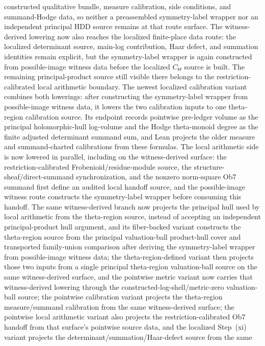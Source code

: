 \documentclass[11pt]{article}
\theoremstyle{plain}
\theoremstyle{definition}
\theoremstyle{remark}
\begin{document}
constructed qualitative bundle, measure calibration, side conditions, and
summand-Hodge data, so neither a preassembled symmetry-label wrapper nor an
independent principal HDD source remains at that route surface.  The
witness-derived lowering now also reaches the localized finite-place data
route: the localized determinant source, main-log contribution, Haar defect,
and summation identities remain explicit, but the symmetry-label wrapper is
again constructed from possible-image witness data before the localized
\(C_\Theta\) source is built.  The remaining principal-product source still
visible there belongs to the restriction-calibrated local arithmetic boundary.
The newest localized calibration variant combines both lowerings: after
constructing the symmetry-label wrapper from possible-image witness data, it
lowers the two calibration inputs to one theta-region calibration source.  Its
endpoint records pointwise pre-ledger volume as the principal holomorphic-hull
log-volume and the Hodge theta-monoid degree as the finite adjusted determinant
summand sum, and Lean projects the older measure and summand-charted
calibrations from these formulas.  The local arithmetic side is now lowered in
parallel, including on the witness-derived surface: the
restriction-calibrated Frobenioid/residue-module source, the
structure-sheaf/direct-summand synchronization, and the nonzero norm-square
Ob7 summand first define an audited local handoff source, and the
possible-image witness route constructs the symmetry-label wrapper before
consuming this handoff.  The same witness-derived branch now projects the
principal hull used by local arithmetic from the theta-region source, instead
of accepting an independent principal-product hull argument, and its
fiber-backed variant constructs the theta-region source from the principal
valuation-ball product-hull cover and transported family-union comparison
after deriving the symmetry-label wrapper from possible-image witness data;
the theta-region-defined variant then projects those two inputs from a single
principal theta-region valuation-ball source on the same witness-derived
surface, and the pointwise metric variant now carries that witness-derived
lowering through the constructed-log-shell/metric-zero valuation-ball source;
the pointwise calibration variant projects the theta-region measure/summand
calibration from the same witness-derived surface; the pointwise local
arithmetic variant also projects the restriction-calibrated Ob7 handoff from
that surface's pointwise source data, and the localized Step~(xi) variant
projects the determinant/summation/Haar-defect source from the same
\end{document}
